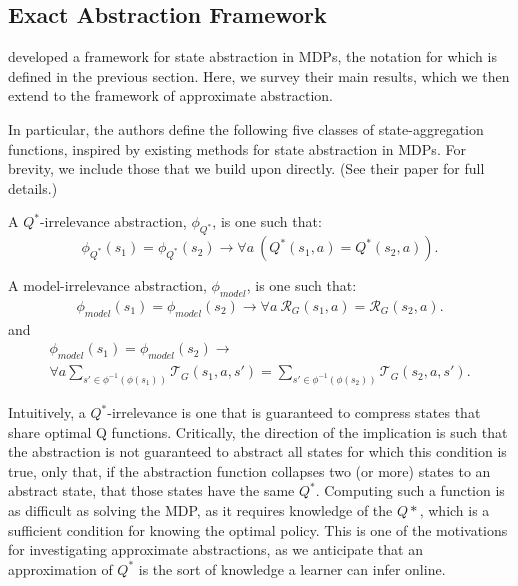 
\subsection{Exact Abstraction Framework}

\citeauthor*{li2006towards} developed a framework for state abstraction in \acp{MDP}, the notation for which is defined in the previous section. Here, we survey their main results, which we then extend to the framework of approximate abstraction.

In particular, the authors define the following five classes of state-aggregation functions, inspired by existing methods for state abstraction in \acp{MDP}. For brevity, we include those that we build upon directly. (See their paper for full details.)

\begin{defn}
A $Q^*$-irrelevance abstraction, $\phi_{Q^*}$, is one such that:
\begin{equation}
\phi_{Q^*}(s_1) = \phi_{Q^*}(s_2) \rightarrow \forall a\ \left(Q^*(s_1,a) = Q^*(s_2,a)\right).
\end{equation}
\end{defn}

\begin{defn}
A model-irrelevance abstraction, $\phi_{model}$, is one such that:
\begin{multline}
\phi_{model}(s_1) = \phi_{model}(s_2) \rightarrow \forall a\ \mathcal{R}_G(s_1,a) = \mathcal{R}_G(s_2,a).
\end{multline}
and
\begin{multline}
\phi_{model}(s_1) = \phi_{model}(s_2) \rightarrow \\ \forall a \sum_{s' \in \phi^{-1}(\phi(s_1))} \mathcal{T}_G(s_1,a,s') = \sum_{s' \in \phi^{-1}(\phi(s_2))} \mathcal{T}_G(s_2,a,s').
\end{multline}
\end{defn}

Intuitively, a $Q^*$-irrelevance is one that is guaranteed to compress states that share optimal Q functions. Critically, the direction of the implication is such that the abstraction is not guaranteed to abstract all states for which this condition is true, only that, if the abstraction function collapses two (or more) states to an abstract state, that those states have the same $Q^*$. Computing such a function is as difficult as solving the MDP, as it requires knowledge of the $Q*$, which is a sufficient condition for knowing the optimal policy. This is one of the motivations for investigating approximate abstractions, as we anticipate that an approximation of $Q^*$ is the sort of knowledge a learner can infer online.


